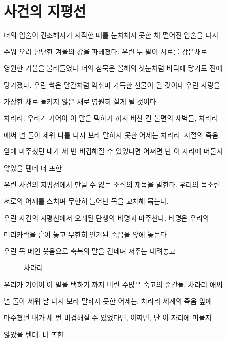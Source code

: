 \hypertarget{uxc0acuxac74uxc758-uxc9c0uxd3c9uxc120}{%

\section{사건의 지평선}\label{uxc0acuxac74uxc758-uxc9c0uxd3c9uxc120}}



너의 입술이 건조해지기 시작한 때를 눈치채지 못한 채 떨어진 입술을 다시

주워 오려 단단한 겨울의 강을 파헤쳤다. 우린 두 팔이 서로를 감은채로

영원한 겨울을 불러들였다 너의 침묵은 올해의 첫눈처럼 바닥에 닿기도 전에

망가졌다. 우린 썩은 달걀처럼 악취미 가득한 선물이 될 것이다 우린 사랑을

가장한 채로 들키지 않은 채로 영원히 살게 될 것이다



차라리: 우리가 기어이 이 말을 택하기 까지 바친 긴 불면의 새벽들, 차라리



애써 널 돌아 세워 나를 다시 보라 말하지 못한 어제는 차라리. 시절의 죽음

앞에 마주쳤던 내가 세 번 비겁해질 수 있었다면 어쩌면 난 이 자리에 머물지

않았을 텐데 너 또한



우린 사건의 지평선에서 만날 수 없는 소식의 제목을 말한다. 우리의 목소린

서로의 어깨를 스치며 무한히 늘어난 목을 교차해 묶는다.



우린 사건의 지평선에서 오래된 탄생의 비명과 마주친다. 비명은 우리의

머리카락을 흩어 놓고 무한히 연기된 죽음을 앞에 놓는다



\begin{description}

\item[우린 목 메인 웃음으로 축복의 말을 건네며 저주는 내려놓고

돌아서겠지 우린 이어진 불면의 끝에 배교자의 죄책감으로 숙면을

포기하겠지]

차라리

\end{description}



우리가 기어이 이 말을 택하기 까지 버린 수많은 숙고의 순간들. 차라리 애써

널 돌아 세워 날 다시 보라 말하지 못한 어제는. 차라리 세계의 죽음 앞에

마주쳤던 내가 세 번 비겁해질 수 있었다면, 어쩌면, 난 이 자리에 머물지

않았을 텐데. 너 또한

